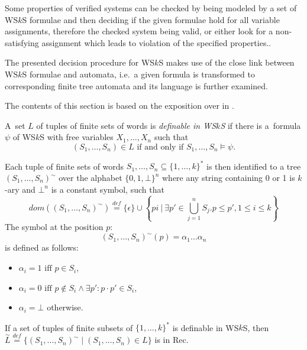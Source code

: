 Some properties of verified systems can be checked by being modeled by a set of
WS$k$S formulae and then deciding if the given formulae hold for all variable
assignments, therefore the checked system being valid, or either look for a
non-satisfying assignment which leads to violation of the specified properties..

The presented decision procedure for WS$k$S makes use of the close link between
WS$k$S formulae and automata, i.e.\ a given formula is transformed to
corresponding finite tree automata and its language is further examined. 

The contents of this section is based on the exposition over in \cite{tata}.

\begin{defz}
 A~set $L$ of tuples of finite sets of words is \emph{definable in WS$k$S} if
 there is a~formula $\psi$ of WS$k$S with free variables $X_1,\ldots,X_n$ such
 that \begin{equation}(S_1,\ldots,S_n) \in L \text{ if and only if }
 S_1,\ldots,S_n \models \psi.\end{equation}
\end{defz} Each tuple of finite sets of words $S_1,\ldots,S_n \subseteq
\{1,\ldots,k\}^*$ is then identified to a tree $(S_1,\ldots,S_n)^\sim$ over the
alphabet $\{0,1,\bot\}^n$ where any string containing 0 or 1 is $k$-ary and
$\bot^n$ is a constant symbol, such that
 \begin{equation}
  dom((S_1,\ldots,S_n)^\sim) \overset{\mathit{def}}{=} \{\epsilon\} \cup \left\{
  pi\ \Bigg|\ \exists p' \in \bigcup_{j = 1}^n S_j.p \leq p', 1 \leq i \leq
  k\right\}
 \end{equation}
The symbol at the position $p$: \begin{equation}(S_1,\ldots,S_n)^\sim(p) =
\alpha_1\ldots\alpha_n\end{equation} is defined as follows:
 \begin{itemize}
  \item $\alpha_i = 1 \text{ iff } p \in S_i$,
  \item $\alpha_i = 0 \text{ iff } p \notin S_i \wedge \exists p': p\cdot p' \in S_i$,
  \item $\alpha_i = \bot$ otherwise.
 \end{itemize}
 
\begin{lemma}
If a set of tuples of finite subsets of $\{1,\ldots,k\}^*$ is definable in
WS$k$S, then $\overset{\sim}{L} \overset{\mathit{def}}{=}
\{(S_1,\ldots,S_n)^\sim \mid (S_1,\ldots,S_n) \in L\}$ is in Rec.
\end{lemma}

